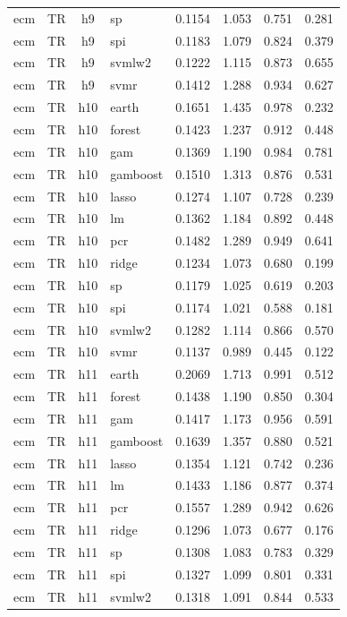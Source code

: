 \begin{ThreePartTable}
\begin{longtable}[t]{llclcccc}
ecm & TR & h9 & sp & 0.1154 & 1.053 & 0.751 & 0.281\\
ecm & TR & h9 & spi & 0.1183 & 1.079 & 0.824 & 0.379\\
ecm & TR & h9 & svmlw2 & 0.1222 & 1.115 & 0.873 & 0.655\\
ecm & TR & h9 & svmr & 0.1412 & 1.288 & 0.934 & 0.627\\
\addlinespace
ecm & TR & h10 & earth & 0.1651 & 1.435 & 0.978 & 0.232\\
ecm & TR & h10 & forest & 0.1423 & 1.237 & 0.912 & 0.448\\
ecm & TR & h10 & gam & 0.1369 & 1.190 & 0.984 & 0.781\\
ecm & TR & h10 & gamboost & 0.1510 & 1.313 & 0.876 & 0.531\\
ecm & TR & h10 & lasso & 0.1274 & 1.107 & 0.728 & 0.239\\
ecm & TR & h10 & lm & 0.1362 & 1.184 & 0.892 & 0.448\\
ecm & TR & h10 & pcr & 0.1482 & 1.289 & 0.949 & 0.641\\
ecm & TR & h10 & ridge & 0.1234 & 1.073 & 0.680 & 0.199\\
ecm & TR & h10 & sp & 0.1179 & 1.025 & 0.619 & 0.203\\
ecm & TR & h10 & spi & 0.1174 & 1.021 & 0.588 & 0.181\\
ecm & TR & h10 & svmlw2 & 0.1282 & 1.114 & 0.866 & 0.570\\
ecm & TR & h10 & svmr & 0.1137 & 0.989 & 0.445 & 0.122\\
\addlinespace
ecm & TR & h11 & earth & 0.2069 & 1.713 & 0.991 & 0.512\\
ecm & TR & h11 & forest & 0.1438 & 1.190 & 0.850 & 0.304\\
ecm & TR & h11 & gam & 0.1417 & 1.173 & 0.956 & 0.591\\
ecm & TR & h11 & gamboost & 0.1639 & 1.357 & 0.880 & 0.521\\
ecm & TR & h11 & lasso & 0.1354 & 1.121 & 0.742 & 0.236\\
ecm & TR & h11 & lm & 0.1433 & 1.186 & 0.877 & 0.374\\
ecm & TR & h11 & pcr & 0.1557 & 1.289 & 0.942 & 0.626\\
ecm & TR & h11 & ridge & 0.1296 & 1.073 & 0.677 & 0.176\\
ecm & TR & h11 & sp & 0.1308 & 1.083 & 0.783 & 0.329\\
ecm & TR & h11 & spi & 0.1327 & 1.099 & 0.801 & 0.331\\
ecm & TR & h11 & svmlw2 & 0.1318 & 1.091 & 0.844 & 0.533\\

\end{longtable}
\end{ThreePartTable}
